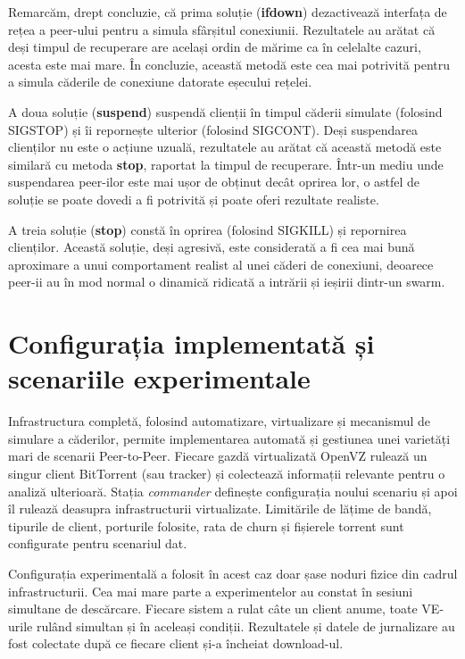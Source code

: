 Remarcăm, drept concluzie, că prima soluție (\textbf{ifdown}) dezactivează
interfața de rețea a peer-ului pentru a simula sfârșitul conexiunii.
Rezultatele au arătat că deși timpul de recuperare are același ordin de
mărime ca în celelalte cazuri, acesta este mai mare. În concluzie, această
metodă este cea mai potrivită pentru a simula căderile de conexiune datorate
eșecului rețelei.

A doua soluție (\textbf{suspend}) suspendă clienții în timpul căderii
simulate (folosind SIGSTOP) și îi repornește ulterior (folosind SIGCONT).
Deși suspendarea clienților nu este o acțiune uzuală, rezultatele au arătat
că această metodă este similară cu metoda \textbf{stop}, raportat la timpul
de recuperare. Într-un mediu unde suspendarea peer-ilor este mai ușor de
obținut decât oprirea lor, o astfel de soluție se poate dovedi a fi
potrivită și poate oferi rezultate realiste.

A treia soluție (\textbf{stop}) constă în oprirea (folosind SIGKILL) și
repornirea clienților. Această soluție, deși agresivă, este
considerată a fi cea mai bună aproximare a unui comportament realist al
unei căderi de conexiuni, deoarece peer-ii au în mod normal o dinamică
ridicată a intrării și ieșirii dintr-un swarm.

\section{Configurația implementată și scenariile experimentale}
\label{sec:virt-infra:setup-scenarios}

Infrastructura completă, folosind automatizare, virtualizare și mecanismul
de simulare a căderilor, permite implementarea automată și gestiunea
unei varietăți mari de scenarii Peer-to-Peer. Fiecare gazdă virtualizată
OpenVZ rulează un singur client BitTorrent (sau tracker) și colectează
informații relevante pentru o analiză ulterioară. Stația \textit{commander}
definește configurația noului scenariu și apoi îl rulează deasupra
infrastructurii virtualizate. Limitările de lățime de bandă, tipurile
de client, porturile folosite, rata de churn și fișierele torrent sunt
configurate pentru scenariul dat.

Configurația experimentală a folosit în acest caz doar șase noduri fizice
din cadrul infrastructurii. Cea mai mare parte a experimentelor au constat
în sesiuni simultane de descărcare. Fiecare sistem a rulat câte un client
anume, toate VE-urile rulând simultan și în aceleași condiții. Rezultatele
și datele de jurnalizare au fost colectate după ce fiecare client și-a
încheiat download-ul.


